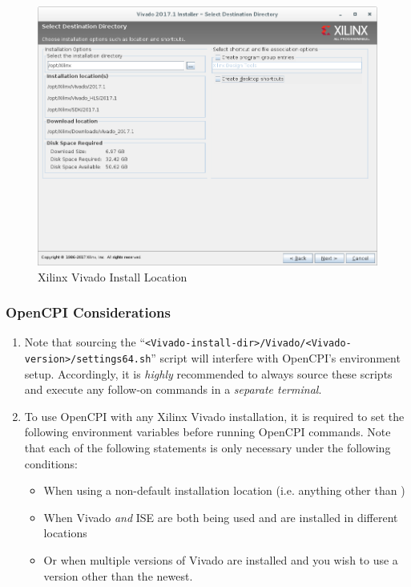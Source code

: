 \begin{flushleft}
\begin{flushleft}
\begin{enumerate}
\begin{figure}[H]
	\centerline{\includegraphics[scale=0.4]{figures/xilinx_vivado_2017_install_location}}
	\caption{Xilinx Vivado Install Location}
\end{figure}
\end{enumerate}
\subsubsection{OpenCPI Considerations}
\begin{enumerate}
\item Note that sourcing the ``\verb+<Vivado-install-dir>/Vivado/<Vivado-version>/settings64.sh+'' script will interfere with OpenCPI's environment setup. Accordingly, it is \textit{highly} recommended to always source these scripts and execute any follow-on commands in a \textit{separate terminal}.
\item To use OpenCPI with any Xilinx Vivado installation, it is required to set the following environment variables before running OpenCPI commands. Note that each of the following  statements is only necessary under the following conditions:
\begin{itemize}
\item When using a non-default installation location (i.e. anything other than )
\item When Vivado \textit{and} ISE are both being used and are installed in different locations
\item Or when multiple versions of Vivado are installed and you wish to use a version other than the newest.
\end{itemize}


\end{enumerate}
\end{flushleft}
\end{flushleft}
